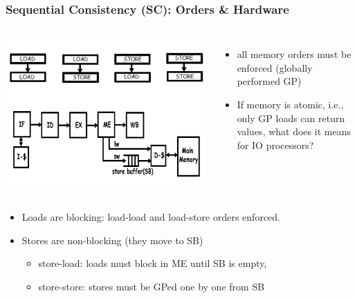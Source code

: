 \documentclass{beamer}
\newcommand{\emp}[1]{\textcolor{DikuRed}{ #1}}
\begin{document}
\begin{frame}[fragile,t]
\frametitle{Sequential Consistency (SC): Orders \& Hardware}

\begin{columns}
\includegraphics[width=44ex]{Ch7Figs/OrdersPipeline}
\begin{itemize}
    \item all memory orders must be enforced (globally performed GP)
    \item If memory is atomic, i.e., only GP loads can return values,
            what does it means for IO processors?
\end{itemize}
\end{columns}

\begin{itemize}
    \item Loads are blocking: load-load and load-store orders enforced.
    \item Stores are non-blocking (they move to SB)
    \begin{itemize}
        \item \emp{store-load:} loads must block in ME until SB is empty,
        \item \emp{store-store:} stores must be GPed one by one from SB
    \end{itemize} 
\end{itemize}
\end{frame}
\end{document}
